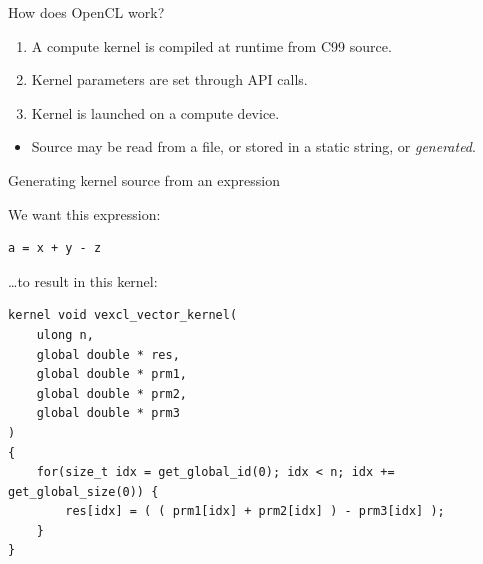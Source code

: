 \documentclass[@BEAMER_OPTIONS@]{beamer}
\begin{document}
\begin{frame}{How does OpenCL work?}
    \begin{enumerate}
        \item A compute kernel is compiled at runtime from C99 source.
        \item Kernel parameters are set through API calls.
        \item Kernel is launched on a compute device.
    \end{enumerate}
    \vspace{\baselineskip}
    \pause
    \begin{itemize}
        \item Source may be read from a file, or stored in a static
            string, or \alert{\emph{generated}}.
    \end{itemize}
\end{frame}

\note{ }

\begin{frame}[fragile]{Generating kernel source from an expression}
    \begin{exampleblock}{We want this expression:}
        \begin{lstlisting}
a = x + y - z
        \end{lstlisting}
    \end{exampleblock}
    \begin{exampleblock}{\ldots to result in this kernel:}
        \begin{lstlisting}
kernel void vexcl_vector_kernel(
    ulong n,
    global double * res,
    global double * prm1,
    global double * prm2,
    global double * prm3
)
{
    for(size_t idx = get_global_id(0); idx < n; idx += get_global_size(0)) {
        res[idx] = ( ( prm1[idx] + prm2[idx] ) - prm3[idx] );
    }
}
        \end{lstlisting}
    \end{exampleblock}
\end{frame}
\end{document}

